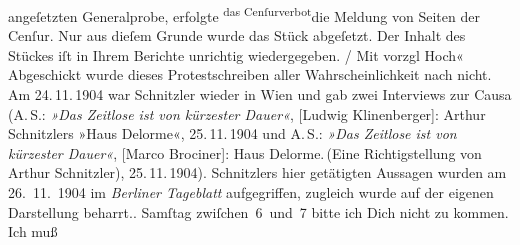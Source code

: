 {{{                        angeſetzten Generalprobe, \strikeout{\textcolor{gray}{er}} erfolgte \substVorne{}\textsuperscript{das Cenſurverbot}\substDazwischen{}die Meldung von Seiten der Cenſur\substHinten{}. Nur aus dieſem Grunde wurde das Stück abgeſetzt. Der Inhalt des Stückes iſt in  Ihrem Berichte unrichtig wiedergegeben.{ / }Mit vorzgl Hoch« Abgeschickt wurde dieses Protestschreiben aller Wahrscheinlichkeit nach
                  nicht. Am 24. 11. 1904 war Schnitzler wieder in Wien und gab zwei Interviews zur Causa (A. S.: \emph{»Das Zeitlose ist von kürzester Dauer«}, [Ludwig Klinenberger]: Arthur Schnitzlers »Haus Delorme«, 25. 11. 1904 und A. S.: \emph{»Das Zeitlose ist von kürzester Dauer«}, [Marco Brociner]: Haus Delorme. (Eine Richtigstellung von Arthur Schnitzler), 25. 11. 1904). Schnitzlers hier getätigten Aussagen wurden
                  am 26. 11. 1904 im \emph{Berliner
                     Tageblatt} aufgegriffen, zugleich wurde auf der eigenen Darstellung
                  beharrt.}}}\label{K_L03456-1}. Samſtag{ }zwiſchen 6 und 7 bitte ich Dich nicht zu kommen. Ich muß
